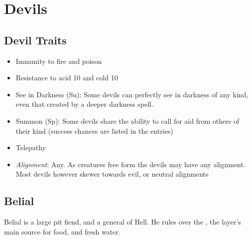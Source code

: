 \section{Devils}
\label{sec:monster:Devils}

\subsection{Devil Traits}
\begin{itemize}[noitemsep]
  \item Immunity to fire and poison
  \item Resistance to acid 10 and cold 10
  \item See in Darkness (Su): Some devils can perfectly see in darkness of any
    kind, even that created by a deeper darkness spell.
  \item Summon (Sp): Some devils share the ability to call for aid from others
    of their kind (success chances are listed in the entries)
  \item Telepathy
  \item \emph{Alignment}: Any. As creatures free form the 
    devils may have any alignment. Most devils however skewer towards evil, or
    neutral alignments
\end{itemize}

\subsection{Belial}
\label{sec:monster:Belial}

Belial is a large pit fiend, and a general of Hell. He rules over the
, the layer's main source for food, and fresh water.

